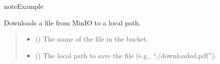 \documentclass[letterpaper,10pt,english]{sphinxmanual}
\begin{document}
\begin{fulllineitems}
\begin{fulllineitems}
\begin{sphinxadmonition}{note}{Example}
\begin{sphinxVerbatim}[commandchars=\\\{\}]
  
\end{sphinxVerbatim}
\end{sphinxadmonition}

\end{fulllineitems}


\begin{fulllineitems}
\label{\detokenize{src.database:src.database.minio.MinioFileSystem.download_file}}
\pysigstartsignatures
\pysiglinewithargsret
{}
{\sphinxparamcomma {}}
{}
\pysigstopsignatures
\sphinxAtStartPar
Downloads a file from MinIO to a local path.
\begin{quote}\begin{description}
\begin{itemize}
\item {} 
\sphinxAtStartPar
{} () \textendash{} The name of the file in the bucket.

\item {} 
\sphinxAtStartPar
{} () \textendash{} The local path to save the file (e.g., “./downloaded.pdf”).

\end{itemize}

\end{description}\end{quote}

\end{fulllineitems}


\end{fulllineitems}
\end{document}
